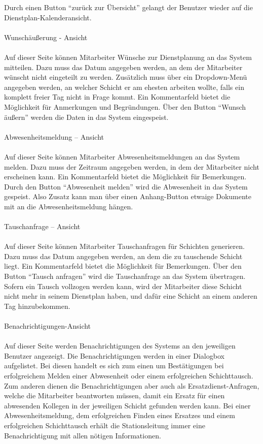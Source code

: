 \documentclass[11pt,
paper=a4,
bibtotocnumbered,	  %
liststotocnumbered,  %
DIV=calc,		  %
tablecaptionabove,	  %
headinclude,
]{article}
\begin{document}
Durch einen Button “zurück zur Übersicht” gelangt der Benutzer wieder auf die Dienstplan-Kalenderansicht.\\\\
Wunschäußerung - Ansicht\\\\
Auf dieser Seite können Mitarbeiter Wünsche zur Dienstplanung an das System mitteilen. Dazu muss das Datum angegeben werden, an dem der Mitarbeiter wünscht nicht eingeteilt zu werden. Zusätzlich muss über ein Dropdown-Menü angegeben werden, an welcher Schicht er am ehesten arbeiten wollte, falls ein komplett freier Tag nicht in Frage kommt. Ein Kommentarfeld bietet die Möglichkeit für Anmerkungen und Begründungen. Über den Button “Wunsch äußern” werden die Daten in das System eingespeist.\\\\
Abwesenheitsmeldung – Ansicht\\\\
Auf dieser Seite können Mitarbeiter Abwesenheitsmeldungen an das System melden. Dazu muss der Zeitraum angegeben werden, in dem der Mitarbeiter nicht erscheinen kann. Ein Kommentarfeld bietet die Möglichkeit für Bemerkungen. Durch den Button “Abwesenheit melden” wird die Abwesenheit in das System gespeist. Also Zusatz kann man über einen Anhang-Button etwaige Dokumente mit an die Abwesenheitsmeldung hängen.\\\\
Tauschanfrage – Ansicht\\\\
Auf dieser Seite können Mitarbeiter Tauschanfragen für Schichten generieren. Dazu muss das Datum angegeben werden, an dem die zu tauschende Schicht liegt. Ein Kommentarfeld bietet die Möglichkeit für Bemerkungen. Über den Button “Tausch anfragen” wird die Tauschanfrage an das System übertragen. Sofern ein Tausch vollzogen werden kann, wird der Mitarbeiter diese Schicht nicht mehr in seinem Dienstplan haben, und dafür eine Schicht an einem anderen Tag hinzubekommen.\\\\
Benachrichtigungen-Ansicht\\\\
Auf dieser Seite werden Benachrichtigungen des Systems an den jeweiligen Benutzer angezeigt. Die Benachrichtigungen werden in einer Dialogbox aufgelistet. Bei diesen handelt es sich zum einen um Bestätigungen bei erfolgreichem Melden einer Abwesenheit oder einem erfolgreichen Schichttausch. Zum anderen dienen die Benachrichtigungen aber auch als Ersatzdienst-Anfragen, welche die Mitarbeiter beantworten müssen, damit ein Ersatz für einen abwesenden Kollegen in der jeweiligen Schicht gefunden werden kann. Bei einer Abwesenheitsmeldung, dem erfolgreichen Finden eines Ersatzes und einem erfolgreichen Schichttausch erhält die Stationsleitung immer eine Benachrichtigung mit allen nötigen Informationen.
\end{document}
